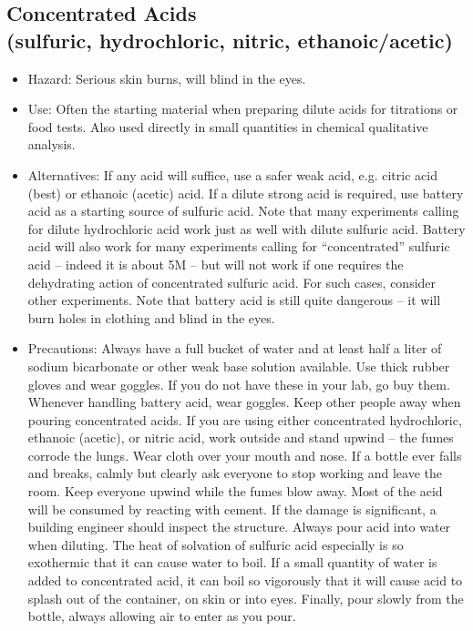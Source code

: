 \subsection{Concentrated Acids\\
(sulfuric, hydrochloric, nitric, ethanoic/acetic)}
\begin{itemize}
\item{Hazard: Serious skin burns, will blind in the eyes.}
\item{Use: Often the starting material 
when preparing dilute acids for titrations or food tests. 
Also used directly in small quantities in chemical qualitative analysis.}
\item{Alternatives: If any acid will suffice, use a safer weak acid, 
e.g. citric acid (best) or ethanoic (acetic) acid. 
If a dilute strong acid is required, 
use battery acid as a starting source of sulfuric acid. 
Note that many experiments calling for dilute hydrochloric acid 
work just as well with dilute sulfuric acid. 
Battery acid will also work for many experiments 
calling for “concentrated” sulfuric acid – 
indeed it is about 5M – but will not work if one requires 
the dehydrating action of concentrated sulfuric acid. 
For such cases, consider other experiments. 
Note that battery acid is still quite dangerous – 
it will burn holes in clothing and blind in the eyes.}
\item{Precautions: Always have a full bucket of water 
and at least half a liter of sodium bicarbonate 
or other weak base solution available. 
Use thick rubber gloves and wear goggles. 
If you do not have these in your lab, go buy them. 
Whenever handling battery acid, wear goggles. 
Keep other people away when pouring concentrated acids. 
If you are using either concentrated hydrochloric, ethanoic (acetic), 
or nitric acid, work outside and stand upwind -- the fumes corrode the lungs. 
Wear cloth over your mouth and nose. 
If a bottle ever falls and breaks, 
calmly but clearly ask everyone to stop working and leave the room. 
Keep everyone upwind while the fumes blow away. 
Most of the acid will be consumed by reacting with cement. 
If the damage is significant, a building engineer should inspect the structure. 
Always pour acid into water when diluting. 
The heat of solvation of sulfuric acid especially is so exothermic 
that it can cause water to boil. 
If a small quantity of water is added to concentrated acid, 
it can boil so vigorously that it will cause acid to splash 
out of the container, on skin or into eyes. 
Finally, pour slowly from the bottle, 
always allowing air to enter as you pour. 
}
\end{itemize}

